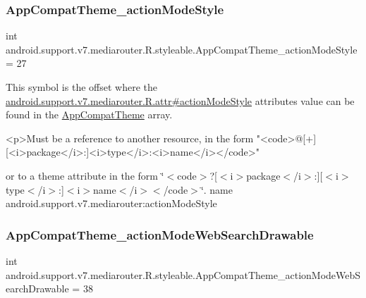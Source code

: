 \subsubsection{\texorpdfstring{App\+Compat\+Theme\+\_\+action\+Mode\+Style}{AppCompatTheme\_actionModeStyle}}
{\footnotesize\ttfamily int android.\+support.\+v7.\+mediarouter.\+R.\+styleable.\+App\+Compat\+Theme\+\_\+action\+Mode\+Style = 27\hspace{0.3cm}{\ttfamily [static]}}

This symbol is the offset where the \hyperlink{classandroid_1_1support_1_1v7_1_1mediarouter_1_1R_1_1attr_af4ab799e706109d4d08297096aa33349}{android.\+support.\+v7.\+mediarouter.\+R.\+attr\#action\+Mode\+Style} attribute\textquotesingle{}s value can be found in the \hyperlink{classandroid_1_1support_1_1v7_1_1mediarouter_1_1R_1_1styleable_a4e3d3900c75d49aeb2f283cac00214d6}{App\+Compat\+Theme} array.

\begin{DoxyVerb}      <p>Must be a reference to another resource, in the form "<code>@[+][<i>package</i>:]<i>type</i>:<i>name</i></code>"
\end{DoxyVerb}
 or to a theme attribute in the form \char`\"{}$<$code$>$?\mbox{[}$<$i$>$package$<$/i$>$\+:\mbox{]}\mbox{[}$<$i$>$type$<$/i$>$\+:\mbox{]}$<$i$>$name$<$/i$>$$<$/code$>$\char`\"{}.  name android.\+support.\+v7.\+mediarouter\+:action\+Mode\+Style \mbox{\label{classandroid_1_1support_1_1v7_1_1mediarouter_1_1R_1_1styleable_a8750fdc15dc71047eb1dcd4f7bb5479e}} 
\subsubsection{\texorpdfstring{App\+Compat\+Theme\+\_\+action\+Mode\+Web\+Search\+Drawable}{AppCompatTheme\_actionModeWebSearchDrawable}}
{\footnotesize\ttfamily int android.\+support.\+v7.\+mediarouter.\+R.\+styleable.\+App\+Compat\+Theme\+\_\+action\+Mode\+Web\+Search\+Drawable = 38\hspace{0.3cm}{\ttfamily [static]}}

